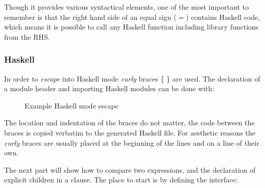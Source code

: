 \documentclass[twoside, titlepage, openright, a4paper]{book}
\newcommand{\Conid}[1]{\mathit{#1}}
\def\resethooks{%
  \global\let\SaveRestoreHook\empty
  \global\let\ColumnHook\empty}
\newlength{\blanklineskip}
\let\hspre\empty
\let\hspost\empty
\begin{document}
Though it provides various syntactical elements, one of the most important to remember is that the right hand side of an equal sign ($=$) contains Haskell code, which means it is possible to call any Haskell function including library functions from the RHS. 

\subsubsection{Haskell}
In order to \emph{escape} into Haskell mode \emph{curly} braces \{ \} are used. The declaration of a module header and importing Haskell modules can be done with:

\begin{figure}[!h]
\resethooks
\caption{Example Haskell mode escape}
\end{figure}

The location and indentation of the braces do not matter, the code between the braces is copied verbatim to the generated Haskell file. For aesthetic reasons the \emph{curly} braces are usually placed at the beginning of the lines and on a line of their own. 

The next part will show how to compare two expressions, and the declaration of  explicit children in a clause. The place to start is by defining the interface:
\end{document}
